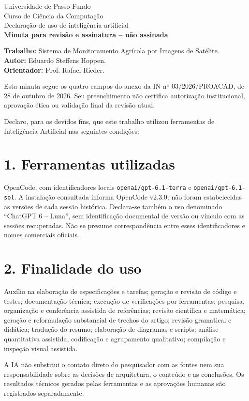 \documentclass[11pt,a4paper]{article}
\begin{document}
\begin{center}
{\large Universidade de Passo Fundo}\\
Curso de Ciência da Computação\\[1em]
{\Large Declaração de uso de inteligência artificial}\\
\textbf{Minuta para revisão e assinatura -- não assinada}
\end{center}

\textbf{Trabalho:} Sistema de Monitoramento Agrícola por Imagens de Satélite.\\
\textbf{Autor:} Eduardo Steffens Hoppen.\\
\textbf{Orientador:} Prof. Rafael Rieder.

Esta minuta segue os quatro campos do anexo da IN nº 03/2026/PROACAD, de 28 de outubro de 2026. Seu preenchimento não certifica autorização institucional, aprovação ética ou validação final da revisão atual.

Declaro, para os devidos fins, que este trabalho utilizou ferramentas de Inteligência Artificial nas seguintes condições:

\section*{1. Ferramentas utilizadas}
OpenCode, com identificadores locais \nolinkurl{openai/gpt-6.1-terra} e \nolinkurl{openai/gpt-6.1-sol}. A instalação consultada informa OpenCode v2.3.0; não foram estabelecidas as versões de cada sessão histórica. Declara-se também o uso denominado ``ChatGPT 6 -- Luna'', sem identificação documental de versão ou vínculo com as sessões recuperadas. Não se presume correspondência entre esses identificadores e nomes comerciais oficiais.

\section*{2. Finalidade do uso}
Auxílio na elaboração de especificações e tarefas; geração e revisão de código e testes; documentação técnica; execução de verificações por ferramentas; pesquisa, organização e conferência assistida de referências; revisão científica e matemática; geração e reformulação substancial de trechos do artigo; revisão gramatical e didática; tradução do resumo; elaboração de diagramas e scripts; análise quantitativa assistida, codificação e agrupamento qualitativo; compilação e inspeção visual assistida.

A IA não substitui o contato direto do pesquisador com as fontes nem sua responsabilidade sobre as decisões de arquitetura, o conteúdo e as conclusões. Os resultados técnicos gerados pelas ferramentas e as aprovações humanas são registrados separadamente.
\end{document}
